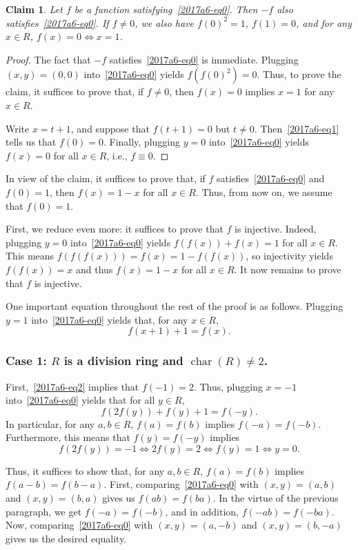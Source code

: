 \documentclass{article}
\DeclareMathOperator{\rchar}{char}
\newtheorem*{claim}{Claim}
\begin{document}
\begin{claim}
Let $f$ be a function satisfying~\eqref{2017a6-eq0}.
Then $-f$ also satisfies~\eqref{2017a6-eq0}.
If $f \neq 0$, we also have $f(0)^2 = 1$, $f(1) = 0$, and for any $x \in R$, $f(x) = 0 \iff x = 1$.
\end{claim}
\begin{proof}
The fact that $-f$ satisfies~\eqref{2017a6-eq0} is immediate.
Plugging $(x, y) = (0, 0)$ into~\eqref{2017a6-eq0} yields $f(f(0)^2) = 0$.
Thus, to prove the claim, it suffices to prove that, if $f \neq 0$, then $f(x) = 0$ implies $x = 1$ for any $x \in R$.

Write $x = t + 1$, and suppose that $f(t + 1) = 0$ but $t \neq 0$.
Then~\eqref{2017a6-eq1} tells us that $f(0) = 0$.
Finally, plugging $y = 0$ into~\eqref{2017a6-eq0} yields $f(x) = 0$ for all $x \in R$, i.e., $f \equiv 0$.
\end{proof}

In view of the claim, it suffices to prove that, if $f$ satisfies~\eqref{2017a6-eq0} and $f(0) = 1$, then $f(x) = 1 - x$ for all $x \in R$.
Thus, from now on, we assume that $f(0) = 1$.

First, we reduce even more: it suffices to prove that $f$ is injective.
Indeed, plugging $y = 0$ into~\eqref{2017a6-eq0} yields $f(f(x)) + f(x) = 1$ for all $x \in R$.
This means $f(f(f(x))) = f(x) = 1 - f(f(x))$, so injectivity yields $f(f(x)) = x$ and thus $f(x) = 1 - x$ for all $x \in R$.
It now remains to prove that $f$ is injective.

One important equation throughout the rest of the proof is as follows.
Plugging $y = 1$ into~\eqref{2017a6-eq0} yields that, for any $x \in R$,
\[ f(x + 1) + 1 = f(x). \tag{2}\label{2017a6-eq2} \]


\subsubsection*{Case 1: $R$ is a division ring and $\rchar(R) \neq 2$.}

First,~\eqref{2017a6-eq2} implies that $f(-1) = 2$.
Thus, plugging $x = -1$ into~\eqref{2017a6-eq0} yields that for all $y \in R$,
\[ f(2f(y)) + f(y) + 1 = f(-y). \]
In particular, for any $a, b \in R$, $f(a) = f(b)$ implies $f(-a) = f(-b)$.
Furthermore, this means that $f(y) = f(-y)$ implies
\[ f(2f(y)) = -1 \iff 2f(y) = 2 \iff f(y) = 1 \iff y = 0. \]

Thus, it suffices to show that, for any $a, b \in R$, $f(a) = f(b)$ implies $f(a - b) = f(b - a)$.
First, comparing~\eqref{2017a6-eq0} with  $(x, y) = (a, b)$ and $(x, y) = (b, a)$ gives us $f(ab) = f(ba)$.
In the virtue of the previous paragraph, we get $f(-a) = f(-b)$, and in addition, $f(-ab) = f(-ba)$.
Now, comparing~\eqref{2017a6-eq0} with $(x, y) = (a, -b)$ and $(x, y) = (b, -a)$ gives us the desired equality.
\end{document}
